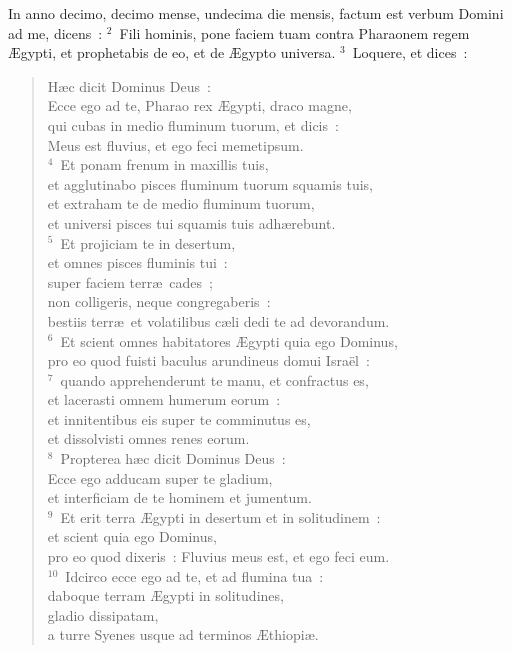 \lettrine[lines=10,image=true,loversize=0.05,lraise=-0.03]{I}{}n anno decimo, decimo mense, undecima die mensis, factum est verbum Domini ad me, dicens~:
${}^{2}$~Fili hominis, pone faciem tuam contra Pharaonem regem \AE gypti, et prophetabis de eo, et de \AE gypto universa.
${}^{3}$~Loquere, et dices~: \begin{flushleft}\begin{verse}H\ae c dicit Dominus Deus~:\\ Ecce ego ad te, Pharao rex \AE gypti, draco magne,\\ qui cubas in medio fluminum tuorum, et dicis~:\\ Meus est fluvius, et ego feci memetipsum.\\
${}^{4}$~Et ponam frenum in maxillis tuis,\\ et agglutinabo pisces fluminum tuorum squamis tuis,\\ et extraham te de medio fluminum tuorum,\\ et universi pisces tui squamis tuis adh\ae rebunt.\\
${}^{5}$~Et projiciam te in desertum,\\ et omnes pisces fluminis tui~:\\ super faciem terr\ae\ cades~;\\ non colligeris, neque congregaberis~:\\ bestiis terr\ae\ et volatilibus c\ae li dedi te ad devorandum.\\
${}^{6}$~Et scient omnes habitatores \AE gypti quia ego Dominus,\\ pro eo quod fuisti baculus arundineus domui Isra\"el~:\\
${}^{7}$~quando apprehenderunt te manu, et confractus es,\\ et lacerasti omnem humerum eorum~:\\ et innitentibus eis super te comminutus es,\\ et dissolvisti omnes renes eorum.\\
${}^{8}$~Propterea h\ae c dicit Dominus Deus~:\\ Ecce ego adducam super te gladium,\\ et interficiam de te hominem et jumentum.\\
${}^{9}$~Et erit terra \AE gypti in desertum et in solitudinem~:\\ et scient quia ego Dominus,\\ pro eo quod dixeris~: Fluvius meus est, et ego feci eum.\\
${}^{10}$~Idcirco ecce ego ad te, et ad flumina tua~:\\ daboque terram \AE gypti in solitudines,\\ gladio dissipatam,\\ a turre Syenes usque ad terminos \AE thiopi\ae .\\

\end{verse}
\end{flushleft}
